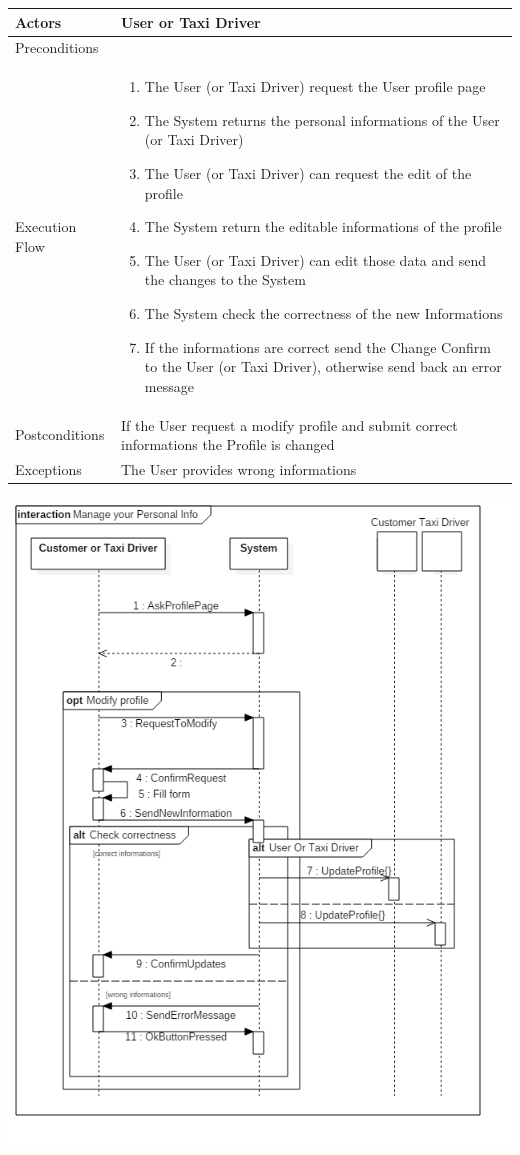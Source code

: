 \documentclass[english]{article}
\begin{document}
\begin{tabular}{lp{8cm}}
\hline
Actors & User or Taxi Driver \\
\hline
Preconditions & \\
\hline
Execution Flow &  
		\begin{enumerate}
			\item The User (or Taxi Driver) request the User profile page
			\item The System returns the personal informations of the User (or Taxi Driver)
			\item The User (or Taxi Driver) can request the edit of the profile
			\item The System return the editable informations of the profile
			\item The User (or Taxi Driver) can edit those data and send the changes to the System
			\item The System check the correctness of the new Informations
			\item If the informations are correct send the Change Confirm to the User (or Taxi Driver), otherwise send back an error message
		\end{enumerate} 
	\\ 
\hline
Postconditions & If the User request a modify profile and submit correct informations the Profile is changed \\
\hline
Exceptions & The User provides wrong informations
\end{tabular}

\includegraphics[width=\textwidth]{ManageInformation}
\end{document}
